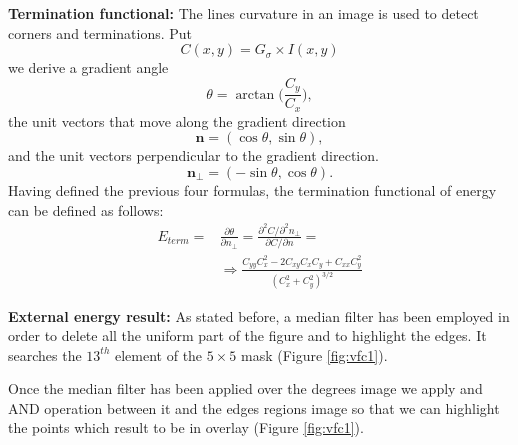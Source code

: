 \documentclass[final,a4paper,12pt,english]{UnicaPhdThesis3}
\begin{document}
\textbf{Termination functional:} The lines curvature in an image is used to detect corners and terminations. Put
\begin{equation}
C(x,y)=G_{{\sigma }} \times I(x,y)
\end{equation}
we derive a gradient angle
\begin{equation}
\theta =\arctan {\Bigg (}{\frac  {C_{y}}{C_{x}}}{\Bigg )},
\end{equation}
the unit vectors that move along the gradient direction 
\begin{equation}
{\mathbf  n}=(\cos \theta ,\sin \theta ),
\end{equation}
and the unit vectors perpendicular to the gradient direction.
\begin{equation}
{\mathbf  n}_{{\perp }}=(-\sin \theta ,\cos \theta ).
\end{equation}
Having defined the previous four formulas, the termination functional of energy can be defined as follows:
\begin{equation}
\begin{split}
E_{{term}}=&{\frac{\partial \theta}{\partial n_{{\perp }}}}={ \frac{\partial ^{2}C/\partial ^{2}n_{{\perp }}}{\partial C/\partial n}}= \\ & %
\Rightarrow {\frac{C_{{yy}}C_{x}^{2}-2C_{{xy}}C_{x}C_{y}+C_{{xx}}C_{y}^{2}}{(C_{x}^{2}+C_{y}^{2})^{{3/2}}}}
\end{split}
\end{equation}

\textbf{External energy result:}  As stated before, a median filter has been employed in order to delete all the uniform part of the figure and to highlight the edges. It searches the $13^{th}$ element of the $5 \times 5$ mask (Figure \ref{fig:vfc1}). 

Once the median filter has been applied over the degrees image we apply and AND operation between it and the edges regions image so that we can highlight the points which result to be in overlay (Figure \ref{fig:vfc1}).
\end{document}
